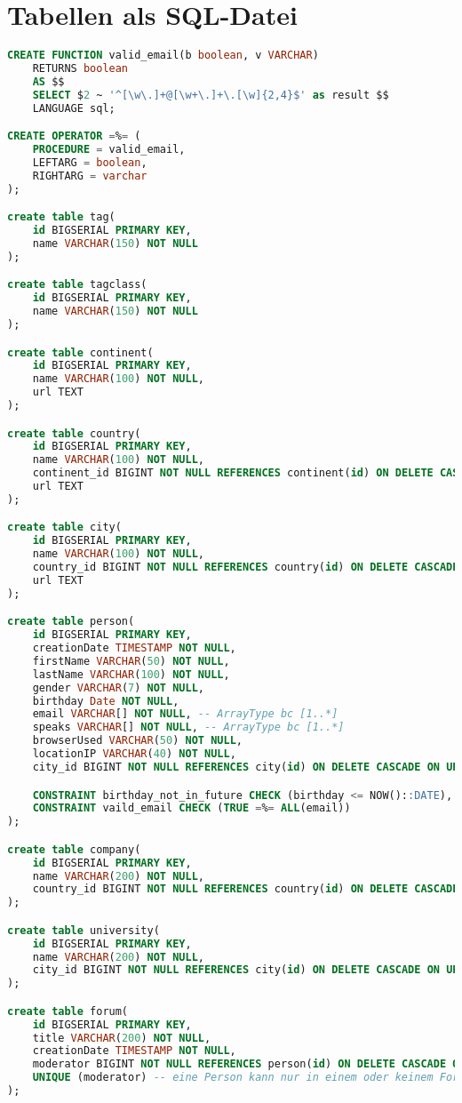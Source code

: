 \section*{Tabellen als SQL-Datei}
\begin{lstlisting}[language=sql]
CREATE FUNCTION valid_email(b boolean, v VARCHAR)
    RETURNS boolean
    AS $$
    SELECT $2 ~ '^[\w\.]+@[\w+\.]+\.[\w]{2,4}$' as result $$
    LANGUAGE sql;

CREATE OPERATOR =%= (
    PROCEDURE = valid_email,
    LEFTARG = boolean,
    RIGHTARG = varchar
);

create table tag(
    id BIGSERIAL PRIMARY KEY,
    name VARCHAR(150) NOT NULL
);

create table tagclass(
    id BIGSERIAL PRIMARY KEY,
    name VARCHAR(150) NOT NULL
);

create table continent(
    id BIGSERIAL PRIMARY KEY,
    name VARCHAR(100) NOT NULL,
    url TEXT
);

create table country(
    id BIGSERIAL PRIMARY KEY,
    name VARCHAR(100) NOT NULL,
    continent_id BIGINT NOT NULL REFERENCES continent(id) ON DELETE CASCADE ON UPDATE CASCADE,
    url TEXT
);

create table city(
    id BIGSERIAL PRIMARY KEY,
    name VARCHAR(100) NOT NULL,
    country_id BIGINT NOT NULL REFERENCES country(id) ON DELETE CASCADE ON UPDATE CASCADE,
    url TEXT
);

create table person(
    id BIGSERIAL PRIMARY KEY,
    creationDate TIMESTAMP NOT NULL,
    firstName VARCHAR(50) NOT NULL,
    lastName VARCHAR(100) NOT NULL,
    gender VARCHAR(7) NOT NULL,
    birthday Date NOT NULL,
    email VARCHAR[] NOT NULL, -- ArrayType bc [1..*]
    speaks VARCHAR[] NOT NULL, -- ArrayType bc [1..*]
    browserUsed VARCHAR(50) NOT NULL,
    locationIP VARCHAR(40) NOT NULL,
    city_id BIGINT NOT NULL REFERENCES city(id) ON DELETE CASCADE ON UPDATE CASCADE,

    CONSTRAINT birthday_not_in_future CHECK (birthday <= NOW()::DATE),
    CONSTRAINT vaild_email CHECK (TRUE =%= ALL(email))
);

create table company(
    id BIGSERIAL PRIMARY KEY,
    name VARCHAR(200) NOT NULL,
    country_id BIGINT NOT NULL REFERENCES country(id) ON DELETE CASCADE ON UPDATE CASCADE
);

create table university(
    id BIGSERIAL PRIMARY KEY,
    name VARCHAR(200) NOT NULL,
    city_id BIGINT NOT NULL REFERENCES city(id) ON DELETE CASCADE ON UPDATE CASCADE
);

create table forum(
    id BIGSERIAL PRIMARY KEY,
    title VARCHAR(200) NOT NULL,
    creationDate TIMESTAMP NOT NULL,
    moderator BIGINT NOT NULL REFERENCES person(id) ON DELETE CASCADE ON UPDATE CASCADE,
    UNIQUE (moderator) -- eine Person kann nur in einem oder keinem Forum Moderator sein
);


\end{lstlisting}
